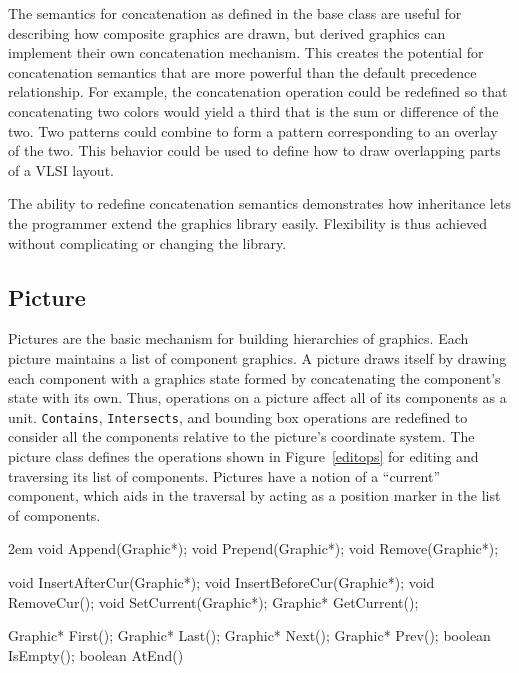 The semantics for concatenation as defined in the base class are useful for
describing how composite graphics are drawn, but derived graphics can
implement their own concatenation mechanism.  This creates the potential for
concatenation semantics that are more powerful than the default precedence
relationship.  For example, the concatenation operation could be redefined
so that concatenating two colors would yield a third that is the sum or
difference of the two.  Two patterns could combine to form a pattern
corresponding to an overlay of the two.  This behavior could be used to
define how to draw overlapping parts of a VLSI layout.

The ability to redefine concatenation semantics demonstrates how
inheritance lets the programmer extend the graphics library easily.
Flexibility is thus achieved without complicating or changing the library.

\subsection{Picture}

Pictures are the basic mechanism for building hierarchies of graphics.  Each
picture maintains a list of component graphics.  A
picture draws itself by drawing each component with a graphics state formed
by concatenating the component's state with its own.  Thus, operations on a
picture affect all of its components as a unit.
{\tt Contains}, {\tt Intersects}, and bounding box operations
are redefined to consider all 
the components relative to the picture's coordinate system.
The picture class defines the operations
shown in Figure~\ref{editops} for editing and traversing its list
of components.  Pictures have a notion of a ``current''
component, which aids in the traversal by acting
as a position marker in the list of components.

\begin{figure*}
\begin{code}{2em}
void Append(Graphic*);
void Prepend(Graphic*);
void Remove(Graphic*);

void InsertAfterCur(Graphic*);
void InsertBeforeCur(Graphic*);
void RemoveCur();
void SetCurrent(Graphic*);
Graphic* GetCurrent();

Graphic* First();
Graphic* Last();
Graphic* Next();
Graphic* Prev();
boolean IsEmpty();
boolean AtEnd()
\end{code}
\vspace{1ex}
\caption{Picture editing operations}
\label{editops}
\end{figure*}

